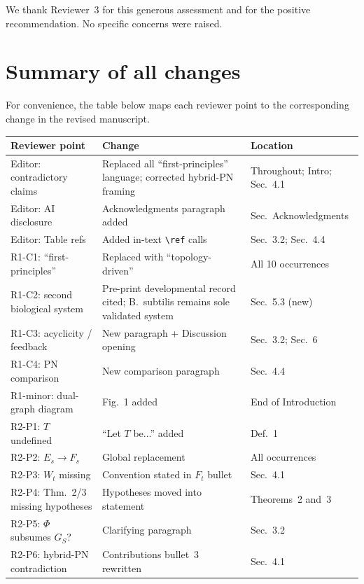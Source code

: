 \documentclass[11pt,letterpaper]{article}
\begin{document}
We thank Reviewer~3 for this generous assessment and for the positive
recommendation. No specific concerns were raised.

\bigskip

\section*{Summary of all changes}

For convenience, the table below maps each reviewer point to the corresponding
change in the revised manuscript.

\begin{center}
\renewcommand{\arraystretch}{1.3}
\begin{tabular}{p{4cm}p{4.5cm}p{5cm}}
\hline
\textbf{Reviewer point} & \textbf{Change} & \textbf{Location} \\
\hline
Editor: contradictory claims & Replaced all ``first-principles'' language; corrected hybrid-PN framing & Throughout; Intro; Sec.~4.1 \\
Editor: AI disclosure & Acknowledgments paragraph added & Sec.~Acknowledgments \\
Editor: Table refs & Added in-text \texttt{\textbackslash ref} calls & Sec.~3.2; Sec.~4.4 \\
R1-C1: ``first-principles'' & Replaced with ``topology-driven'' & All 10 occurrences \\
R1-C2: second biological system & Pre-print developmental record cited; B.~subtilis remains sole validated system & Sec.~5.3 (new) \\
R1-C3: acyclicity / feedback & New paragraph + Discussion opening & Sec.~3.2; Sec.~6 \\
R1-C4: PN comparison & New comparison paragraph & Sec.~4.4 \\
R1-minor: dual-graph diagram & Fig.~1 added & End of Introduction \\
R2-P1: $T$ undefined & ``Let $T$ be...'' added & Def.~1 \\
R2-P2: $E_s \to F_s$ & Global replacement & All occurrences \\
R2-P3: $W_t$ missing & Convention stated in $F_t$ bullet & Sec.~4.1 \\
R2-P4: Thm.~2/3 missing hypotheses & Hypotheses moved into statement & Theorems~2 and~3 \\
R2-P5: $\Phi$ subsumes $G_S$? & Clarifying paragraph & Sec.~3.2 \\
R2-P6: hybrid-PN contradiction & Contributions bullet~3 rewritten & Sec.~4.1 \\
\hline
\end{tabular}
\end{center}
\end{document}
